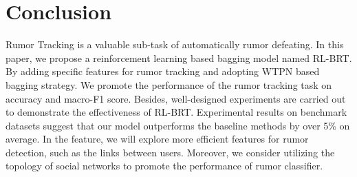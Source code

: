 \section{Conclusion}
\label{sec:conclusion}
Rumor Tracking is a valuable sub-task of automatically rumor defeating. In this paper, we propose a reinforcement learning based bagging model named RL-BRT. By adding specific features for rumor tracking and adopting WTPN based bagging strategy. We promote the performance of the rumor tracking task on accuracy and macro-F1 score. Besides, well-designed experiments are carried out to demonstrate the effectiveness of RL-BRT. Experimental results on benchmark datasets suggest that our model outperforms the baseline methods by over 5\% on average. In the feature, we will explore more efficient features for rumor detection, such as the links between users. Moreover, we consider utilizing the topology of social networks to promote the performance of rumor classifier.